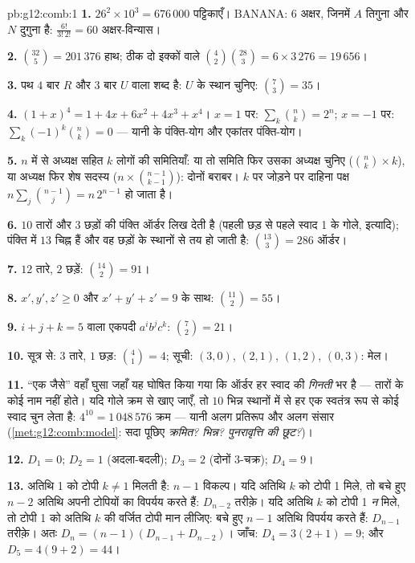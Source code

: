 \begin{solution}{pb:g12:comb:1}
\textbf{1.} $26^2 \times 10^3 = 676\,000$ पट्टिकाएँ। $\mathrm{BANANA}$: $6$ अक्षर, जिनमें $A$ तिगुना
और $N$ दुगुना है: $\frac{6!}{3!\,2!} = 60$ अक्षर-विन्यास।

\textbf{2.} $\binom{32}{5} = 201\,376$ हाथ; ठीक दो इक्कों वाले $\binom42 \binom{28}{3} = 6 \times 3\,276 = 19\,656$।

\textbf{3.} पथ $4$ बार $R$ और $3$ बार $U$ वाला शब्द है: $U$ के स्थान चुनिए:
$\binom73 = 35$।

\textbf{4.} $(1+x)^4 = 1 + 4x + 6x^2 + 4x^3 + x^4$। $x = 1$ पर: $\sum_k \binom nk = 2^n$; $x = -1$ पर: $\sum_k (-1)^k \binom nk = 0$ --- यानी  के
पंक्ति-योग और एकांतर पंक्ति-योग।

\textbf{5.} $n$ में से अध्यक्ष सहित $k$ लोगों की समितियाँ: या तो समिति फिर
उसका अध्यक्ष चुनिए ($\binom nk \times k$), या अध्यक्ष फिर शेष सदस्य ($n \times \binom{n-1}{k-1}$): दोनों बराबर।
$k$ पर जोड़ने पर दाहिना पक्ष $n \sum_j \binom{n-1}{j} = n\,2^{n-1}$ हो जाता है।

\textbf{6.} $10$ तारों और $3$ छड़ों की पंक्ति ऑर्डर लिख देती है (पहली छड़
से पहले स्वाद 1 के गोले, इत्यादि); पंक्ति में $13$ चिह्न हैं और वह छड़ों के
स्थानों से तय हो जाती है: $\binom{13}{3} = 286$ ऑर्डर।

\textbf{7.} $12$ तारे, $2$ छड़ें: $\binom{14}{2} = 91$।

\textbf{8.} $x', y', z' \geq 0$ और $x' + y' + z' = 9$ के साथ: $\binom{11}{2} = 55$।

\textbf{9.} $i + j + k = 5$ वाला एकपदी $a^i b^j c^k$: $\binom72 = 21$।

\textbf{10.} सूत्र से: $3$ तारे, $1$ छड़: $\binom41 = 4$; सूची: $(3,0)$, $(2,1)$,
$(1,2)$, $(0,3)$: मेल।

\textbf{11.} ``एक जैसे'' वहाँ घुसा जहाँ यह घोषित किया गया कि ऑर्डर हर स्वाद
की \emph{गिनती} भर है --- तारों के कोई नाम नहीं होते। यदि गोले क्रम से खाए
जाएँ, तो $10$ भिन्न स्थानों में से हर एक स्वतंत्र रूप से कोई स्वाद चुन लेता
है: $4^{10} = 1\,048\,576$ क्रम --- यानी अलग प्रतिरूप और अलग संसार (\cref{met:g12:comb:model}: सदा पूछिए
\emph{क्रमित? भिन्न? पुनरावृत्ति की छूट?})।

\textbf{12.} $D_1 = 0$; $D_2 = 1$ (अदला-बदली); $D_3 = 2$ (दोनों $3$-चक्र); $D_4 = 9$।

\textbf{13.} अतिथि 1 को टोपी $k \neq 1$ मिलती है: $n - 1$ विकल्प। यदि अतिथि $k$ को
टोपी 1 मिले, तो बचे हुए $n - 2$ अतिथि अपनी टोपियों का विपर्यय करते हैं: $D_{n-2}$
तरीक़े। यदि अतिथि $k$ को टोपी 1 \emph{न} मिले, तो टोपी 1 को अतिथि $k$ की
वर्जित टोपी मान लीजिए: बचे हुए $n - 1$ अतिथि विपर्यय करते हैं: $D_{n-1}$ तरीक़े।
अतः $D_n = (n-1)(D_{n-1} + D_{n-2})$। जाँच: $D_4 = 3(2 + 1) = 9$; और $D_5 = 4(9 + 2) = 44$।


\end{solution}
